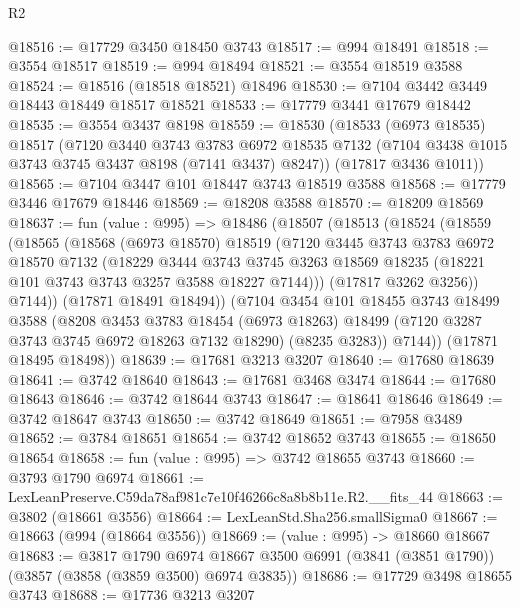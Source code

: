 \begin{lexlean}{R2}
\begin{coremodule}
@18516 := @17729 @3450 @18450 @3743
@18517 := @994 @18491
@18518 := @3554 @18517
@18519 := @994 @18494
@18521 := @3554 @18519 @3588
@18524 := @18516 (@18518 @18521) @18496
@18530 := @7104 @3442 @3449 @18443 @18449 @18517 @18521
@18533 := @17779 @3441 @17679 @18442
@18535 := @3554 @3437 @8198
@18559 := @18530
    (@18533
      (@6973 @18535)
      @18517
      (@7120
        @3440
        @3743
        @3783
        @6972
        @18535
        @7132
        (@7104 @3438 @1015 @3743 @3745 @3437 @8198 (@7141 @3437) @8247))
      (@17817 @3436 @1011))
@18565 := @7104 @3447 @101 @18447 @3743 @18519 @3588
@18568 := @17779 @3446 @17679 @18446
@18569 := @18208 @3588
@18570 := @18209 @18569
@18637 := fun (value : @995) =>
  @18486
    (@18507
      (@18513
        (@18524
          (@18559
            (@18565
              (@18568
                (@6973 @18570)
                @18519
                (@7120
                  @3445
                  @3743
                  @3783
                  @6972
                  @18570
                  @7132
                  (@18229
                    @3444
                    @3743
                    @3745
                    @3263
                    @18569
                    @18235
                    (@18221 @101 @3743 @3743 @3257 @3588 @18227 @7144)))
                (@17817 @3262 @3256))
              @7144))
          (@17871 @18491 @18494))
        (@7104
          @3454
          @101
          @18455
          @3743
          @18499
          @3588
          (@8208
            @3453
            @3783
            @18454
            (@6973 @18263)
            @18499
            (@7120 @3287 @3743 @3745 @6972 @18263 @7132 @18290)
            (@8235 @3283))
          @7144))
      (@17871 @18495 @18498))
@18639 := @17681 @3213 @3207
@18640 := @17680 @18639
@18641 := @3742 @18640
@18643 := @17681 @3468 @3474
@18644 := @17680 @18643
@18646 := @3742 @18644 @3743
@18647 := @18641 @18646
@18649 := @3742 @18647 @3743
@18650 := @3742 @18649
@18651 := @7958 @3489
@18652 := @3784 @18651
@18654 := @3742 @18652 @3743
@18655 := @18650 @18654
@18658 := fun (value : @995) => @3742 @18655 @3743
@18660 := @3793 @1790 @6974
@18661 := LexLeanPreserve.C59da78af981c7e10f46266c8a8b8b11e.R2.__fits_44
@18663 := @3802 (@18661 @3556)
@18664 := LexLeanStd.Sha256.smallSigma0
@18667 := @18663 (@994 (@18664 @3556))
@18669 := (value : @995) -> @18660 @18667
@18683 := @3817
    @1790
    @6974
    @18667
    @3500
    @6991
    (@3841 (@3851 @1790))
    (@3857 (@3858 (@3859 @3500) @6974 @3835))
@18686 := @17729 @3498 @18655 @3743
@18688 := @17736 @3213 @3207

\end{coremodule}
\end{lexlean}
